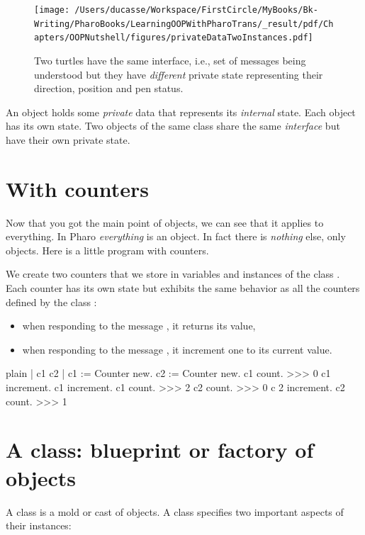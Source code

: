 \documentclass[10pt,twoside,english]{_support/latex/sbabook/sbabook}
\begin{document}
\begin{figure}

\begin{center}
\texttt{[image: /Users/ducasse/Workspace/FirstCircle/MyBooks/Bk-Writing/PharoBooks/LearningOOPWithPharoTrans/\_result/pdf/Chapters/OOPNutshell/figures/privateDataTwoInstances.pdf]}\caption{Two turtles have the same interface, i.e., set of messages  being understood but they have \textit{different} private state representing their  direction, position and pen status.\label{fig:twoInstances}}\end{center}
\end{figure}


\begin{important}
An object holds some \textit{private} data that represents its \textit{internal} state. Each object has its own state. Two objects of the same class share the same \textit{interface} but have their own private state.
\end{important}
\section{With counters}
Now that you got the main point of objects, we can see that it applies to everything. In Pharo \textit{everything} is an object. In fact there is \textit{nothing} else, only objects. Here is a little program with counters. 

We create two counters that we store in variables  and  instances of the class . Each counter has its own state but exhibits the same behavior as all the counters defined by the class : 

\begin{itemize}
\item when responding to the message , it returns its value,
\item when responding to the message , it increment one to its current value. 
\end{itemize}

\begin{displaycode}{plain}
| c1 c2 |
c1 := Counter new.
c2 := Counter new.
c1 count.
>>> 0
c1 increment.
c1 increment.
c1 count. 
>>> 2
c2 count.
>>> 0
c 2 increment.
c2 count. 
>>> 1
\end{displaycode}
\section{A class: blueprint or factory of objects}
A class is a mold or cast of objects. A class specifies two important aspects of their instances:
\end{document}
